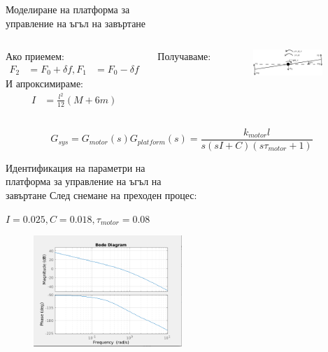 \documentclass{beamer}
\begin{document}
\begin{frame}{Моделиране на платформа за\\управление на ъгъл на завъртане}
	\begin{columns}

		Ако приемем:
		\begin{align*}
			F_2 &= F_0 + \delta f,F_1 &= F_0 - \delta f 
		\end{align*}
		И апроксимираме:
		\begin{align*}
			I &= \frac{l^2}{12}(M + 6m)
		\end{align*}

		Получаваме:\\[1em]

		
		\begin{figure}[htpb!]
			\centering
			\includegraphics[width=0.9\textwidth]{Images/balance_force_diagram.png}
		\end{figure}

	\end{columns}

	\begin{equation*}
	G_{sys} = G_{motor}(s)G_{platform}(s) = 
	\frac{k_{motor} l}{s( s I + C)(s \tau_{motor} + 1)} 
	\end{equation*}

\end{frame}

\begin{frame}{Идентификация на параметри на \\ платформа за управление на ъгъл на \\завъртане}
	\pause
		След снемане на преходен процес:
		\pause
		
		\(I = 0.025, C = 0.018, \tau_{motor} = 0.08\)
		\pause

	\begin{figure}[htpb!]
		\centering
		\includegraphics[width=0.5\textwidth]{Images/bode_balance.png}
	\end{figure}
\end{frame}
\end{document}

